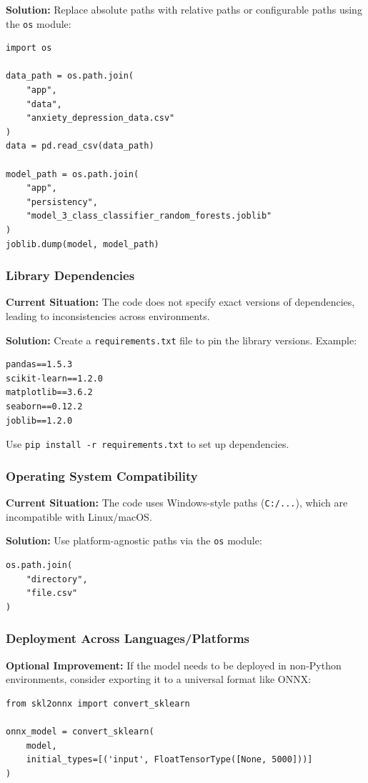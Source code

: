 \documentclass[runningheads,a4paper,11pt]{report}
\begin{document}
\textbf{Solution:} Replace absolute paths with relative paths or configurable paths using the \texttt{os} module:
\begin{verbatim}
import os

data_path = os.path.join(
    "app", 
    "data", 
    "anxiety_depression_data.csv"
)
data = pd.read_csv(data_path)

model_path = os.path.join(
    "app", 
    "persistency", 
    "model_3_class_classifier_random_forests.joblib"
)
joblib.dump(model, model_path)
\end{verbatim}

\subsubsection{Library Dependencies}
\label{section:library-dependencies}
\textbf{Current Situation:} The code does not specify exact versions of dependencies, leading to inconsistencies across environments.

\textbf{Solution:} Create a \texttt{requirements.txt} file to pin the library versions. Example:
\begin{verbatim}
pandas==1.5.3
scikit-learn==1.2.0
matplotlib==3.6.2
seaborn==0.12.2
joblib==1.2.0
\end{verbatim}
Use \texttt{pip install -r requirements.txt} to set up dependencies.

\subsubsection{Operating System Compatibility}
\label{section:os-comatibility}
\textbf{Current Situation:} The code uses Windows-style paths (\texttt{C:/...}), which are incompatible with Linux/macOS.

\textbf{Solution:} Use platform-agnostic paths via the \texttt{os} module:
\begin{verbatim}
os.path.join(
    "directory", 
    "file.csv"
)
\end{verbatim}

\subsubsection{Deployment Across Languages/Platforms}
\label{section:deployment-across}
\textbf{Optional Improvement:} If the model needs to be deployed in non-Python environments, consider exporting it to a universal format like ONNX:
\begin{verbatim}
from skl2onnx import convert_sklearn

onnx_model = convert_sklearn(
    model, 
    initial_types=[('input', FloatTensorType([None, 5000]))]
)
\end{verbatim}
\end{document}
